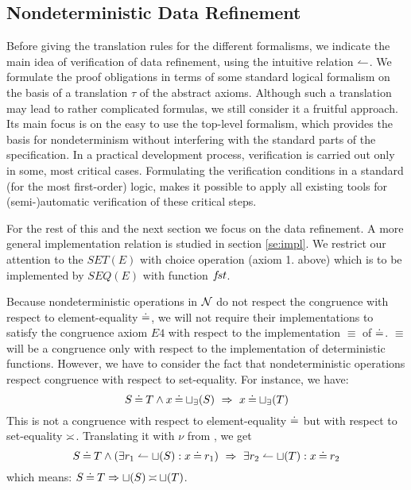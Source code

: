 \subsection{Nondeterministic Data Refinement} Before giving the translation rules for the different formalisms, we indicate the main
idea of verification of data refinement, using the intuitive relation $\leftharpoonup$.
We formulate the proof obligations in terms of some standard logical formalism on the basis of a translation $\tau$ of the abstract axioms. Although
such a translation may lead to rather complicated formulas, we still consider it
a fruitful approach. Its main focus is on the easy to use the top-level formalism,
which provides the basis for nondeterminism without interfering with the standard parts of the specification.
In a practical development process, verification is carried out only in some, most critical cases. Formulating the verification conditions in a standard (for the most first-order) logic, makes it possible to apply all existing tools
for (semi-)automatic verification of these critical steps. 

For the rest of this and the next section we focus on the data refinement. A more general implementation relation is studied in section \ref{se:impl}. We restrict our attention to the $SET(E)$ with choice operation (axiom 1. above) which is to be implemented by $SEQ(E)$ with function $f\!st$. 

Because nondeterministic operations in $\cal N$ do not respect the congruence with respect to element-equality $\mathbin{\doteq}$, we will not require their implementations to
satisfy the congruence axiom $E4$ with respect to the implementation $\equiv$ of
$\mathbin{\doteq}$.
$\equiv$ will be a congruence only with respect to the implementation of deterministic functions.
However, we have to consider the fact that nondeterministic operations respect
congruence with respect to set-equality. For instance, we have: 
\[ S\mathbin{\doteq} T\land x\mathbin{\doteq} \sqcup_\exists(S)\ \mathrel\Rightarrow\ x\mathbin{\doteq} \sqcup_\exists(T) \] 
This is not a congruence with respect to element-equality $\mathbin{\doteq}$ but with respect
to
set-equality $\mathbin{\asymp}$. Translating it with $\nu$ from , we get
\begin{equation}\label{eq:setcong}
S\Eq T\land (\exists r_1\isres\ch(S):x\Eq r_1)\ \impl\ 
\exists r_2\isres\ch(T): x\Eq r_2
\end{equation}
which means: $S\mathbin{\doteq} T \mathrel\Rightarrow \sqcup(S)\mathbin{\asymp}\sqcup(T)$. 

